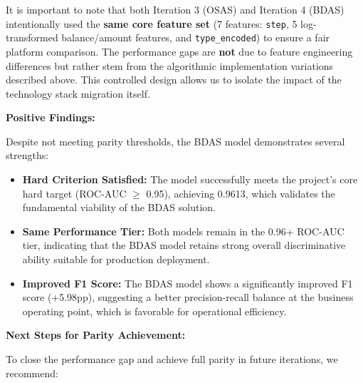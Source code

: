 \documentclass[sigplan,screen]{acmart}
\begin{document}
It is important to note that both Iteration 3 (OSAS) and Iteration 4 (BDAS) intentionally used the \textbf{same core feature set} (7 features: \texttt{step}, 5 log-transformed balance/amount features, and \texttt{type\_encoded}) to ensure a fair platform comparison. The performance gaps are \textbf{not} due to feature engineering differences but rather stem from the algorithmic implementation variations described above. This controlled design allows us to isolate the impact of the technology stack migration itself.

\textbf{Positive Findings:}

Despite not meeting parity thresholds, the BDAS model demonstrates several strengths:

\begin{itemize}
\item \textbf{Hard Criterion Satisfied:} The model successfully meets the project's core hard target (ROC-AUC $\geq$ 0.95), achieving 0.9613, which validates the fundamental viability of the BDAS solution.
\item \textbf{Same Performance Tier:} Both models remain in the 0.96+ ROC-AUC tier, indicating that the BDAS model retains strong overall discriminative ability suitable for production deployment.
\item \textbf{Improved F1 Score:} The BDAS model shows a significantly improved F1 score (+5.98pp), suggesting a better precision-recall balance at the business operating point, which is favorable for operational efficiency.
\end{itemize}

\textbf{Next Steps for Parity Achievement:}

To close the performance gap and achieve full parity in future iterations, we recommend:
\end{document}
